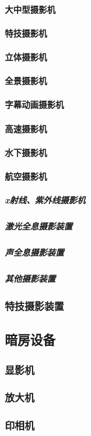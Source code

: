 \documentclass[UTF8]{../../ApplicationUniverse}
\begin{document}
            \paragraph{大中型摄影机}
            \paragraph{特技摄影机}
            \paragraph{立体摄影机}
            \paragraph{全景摄影机}
            \paragraph{字幕动画摄影机}
            \paragraph{高速摄影机}
            \paragraph{水下摄影机}
            \paragraph{航空摄影机}
                \subparagraph{x射线、紫外线摄影机}
                \subparagraph{激光全息摄影装置}
                \subparagraph{声全息摄影装置}
                \subparagraph{其他摄影装置}
        \subsubsection{特技摄影装置}
    \subsection{暗房设备}
        \subsubsection{显影机}
        \subsubsection{放大机}
        \subsubsection{印相机}
\end{document}
